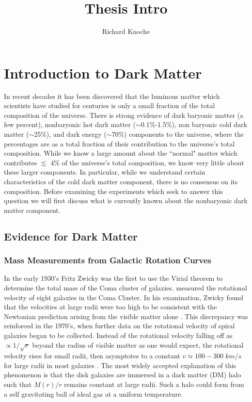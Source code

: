 \documentclass[a4paper,12pt]{article}
\begin{document}
\title{Thesis Intro}
\author{Richard Knoche}
\maketitle

\tableofcontents

\section{Introduction to Dark Matter}

In recent decades it has been discovered that the luminous matter which scientists have studied for centuries is only a small fraction of the total composition of the universe.  There is strong evidence of dark baryonic matter (a few percent), nonbaryonic hot dark matter ($\sim$0.1\%-1.5\%), non baryonic cold dark matter ($\sim$25\%), and dark energy ($\sim$70\%) components to the universe, where the percentages are as a total fraction of their contribution to the universe's total composition.  While we know a large amount about the ``normal" matter which contributes $ \lesssim $ 4\% of the universe's total composition, we know very little about these larger components.  In particular, while we understand certain characteristics of the cold dark matter component, there is no consensus on its composition.  Before examining the experiments which seek to answer this question we will first discuss what is currently known about the nonbaryonic dark matter component.

\subsection{Evidence for Dark Matter}

\subsubsection{Mass Measurements from Galactic Rotation Curves}

In the early 1930's Fritz Zwicky was the first to use the Virial theorem to determine the total mass of the Coma cluster of galaxies.   measured the rotational velocity of eight galaxies in the Coma Cluster. In his examination, Zwicky found that the velocities at large radii were too high to be consistent with the Newtonian prediction arising from the visible matter alone \cite{Zwicky}. This discrepancy was reinforced in the 1970's, when further data on the rotational velocity of spiral galaxies began to be collected.  Instead of the rotational velocity falling off as $\propto 1/\sqrt{r}$ beyond the radius of visible matter as one would expect, the rotational velocity rises for small radii, then asymptotes to a constant $ v \simeq 100-300 \; km/s $ for large radii in most galaxies \cite{Persic,Battaner,Binney}.  The most widely accepted explanation of this phenomenon is that the disk galaxies are immersed in a dark matter (DM) halo such that $ M(r)/r $ remains constant at large radii.  Such a halo could form from a self gravitating ball of ideal gas at a uniform temperature.
\end{document}
